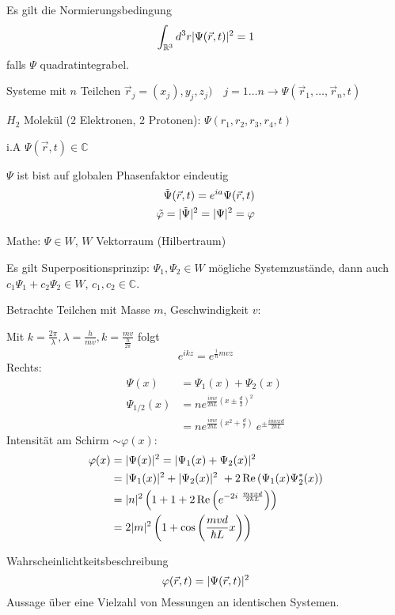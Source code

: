 Es gilt die Normierungsbedingung
\begin{equation*}
    \int_{\mathbb{R}^3} d^3 r \lvert \Psi(\vec{r},t)\rvert^2=1
\end{equation*}
falls $\Psi$ quadratintegrabel.
\begin{bem}
    \item 
    Systeme mit $n$ Teilchen $\vec{r}_j = (x_j),y_j,z_j) \quad j=1 \ldots
    n \rightarrow \Psi(\vec{r}_1, \ldots, \vec{r}_n,t)$

    $H_2$ Molekül (2 Elektronen, 2 Protonen): $\Psi(r_1,r_2,r_3,r_4,t)$ 
    \item
    i.A $\Psi(\vec{r},t) \in \mathbb{C}$
    \item
    $\Psi$ ist bist auf globalen Phasenfaktor eindeutig 
    \begin{align*}
        \tilde{\Psi}(\vec{r},t)=
        e^{ia} \Psi(\vec{r},t) \\
        \tilde{\varphi}=\lvert \tilde{\Psi} \rvert^2 = \lvert \Psi \rvert^2 = \varphi
    \end{align*}
    \item Mathe: $\Psi \in W$, $W$ Vektorraum (Hilbertraum)

    Es gilt Superpositionsprinzip: $\Psi_1, \Psi_2 \in W$ mögliche
    Systemzustände, dann auch $c_1 \Psi_1 + c_2 \Psi_2 \in W$, $c_1,c_2 \in
    \mathbb{C}$. 

    Betrachte Teilchen mit Masse $m$, Geschwindigkeit $v$:

    Mit
    $k=\frac{2\pi}{\lambda},\lambda=\frac{h}{mv},k=\frac{mv}{\frac{h}{2\pi}}$
    folgt
    \begin{equation*}
        e^{ikz} = e^{\frac{i}{\hbar}mvz}
    \end{equation*}
    Rechts:
    \begin{align*}
        \Psi(x) &= \Psi_1(x) + \Psi_2(x) \\
        \Psi_{1/2}(x) &= n e^{\frac{imv}{2\hbar L}\left(x \pm \frac{d}{2}\right)^2} \\
        &= n e^{\frac{imv}{2\hbar L}\left(x^2 + \frac{d}{r}\right)} \
        e^{\pm \frac{imvxd}{2\hbar L}}
    \end{align*}
    Intensität am Schirm $\sim \varphi(x)$:
    \begin{align*}
       \varphi(x) &= \lvert \Psi(x) \rvert^2 = \lvert \Psi_1(x) + \Psi_2(x)\lvert^2 \\
                &= \lvert \Psi_1(x) \rvert^2 + \lvert \Psi_2(x) \rvert^2 \
                    + 2\operatorname{Re} \left( \Psi_1(x) \Psi_2^*(x) \right) \\
                &= \lvert n \rvert^2  \left( 1 + 1 + 2\operatorname{Re} \left( e^{-2i \
                    \frac{mvxd}{2\hbar L}}\right) \right)\\
                &= 2 \lvert m \rvert^2 \left( 1 + \cos \left(\frac{mvd}{\hbar L}x \right) \right)
    \end{align*}
    \item \qme Wahrscheinlichtkeitsbeschreibung
    \begin{equation*}
        \varphi(\vec{r},t) = \lvert \Psi(\vec{r},t)\rvert^2
    \end{equation*}
    Aussage über eine Vielzahl von Messungen an identischen Systemen.


\end{bem}
